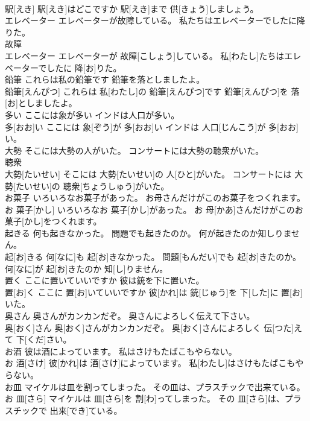 \documentclass[8pt]{extreport}
\begin{document}
\begin{CJK}{UTF8}{min}
\\	駅[えき] 駅[えき]はどこですか 駅[えき]まで 供[きょう]しましょう。
\\	エレベーター エレベーターが故障している。 私たちはエレベーターでしたに降りた。	
\\	故障 
\\	エレベーター エレベーターが 故障[こしょう]している。 私[わたし]たちはエレベーターでしたに 降[お]りた。
\\	鉛筆 これらは私の鉛筆です 鉛筆を落としましたよ。	
\\	鉛筆[えんぴつ] これらは 私[わたし]の 鉛筆[えんぴつ]です 鉛筆[えんぴつ]を 落[お]としましたよ。
\\	多い ここには象が多い インドは人口が多い。	
\\	多[おお]い ここには 象[ぞう]が 多[おお]い インドは 人口[じんこう]が 多[おお]い。
\\	大勢 そこには大勢の人がいた。 コンサートには大勢の聴衆がいた。	
\\	聴衆 
\\	大勢[たいせい] そこには 大勢[たいせい]の 人[ひと]がいた。 コンサートには 大勢[たいせい]の 聴衆[ちょうしゅう]がいた。
\\	お菓子 いろいろなお菓子があった。 お母さんだけがこのお菓子をつくれます。	
\\	お 菓子[かし] いろいろなお 菓子[かし]があった。 お 母[かあ]さんだけがこのお 菓子[かし]をつくれます。
\\	起きる 何も起きなかった。 問題でも起きたのか。 何が起きたのか知しりません。	
\\	起[お]きる 何[なに]も 起[お]きなかった。 問題[もんだい]でも 起[お]きたのか。 何[なに]が 起[お]きたのか 知[し]りません。
\\	置く ここに置いていいですか 彼は銃を下に置いた。	
\\	置[お]く ここに 置[お]いていいですか 彼[かれ]は 銃[じゅう]を 下[した]に 置[お]いた。
\\	奥さん 奥さんがカンカンだぞ。 奥さんによろしく伝えて下さい。	
\\	奥[おく]さん 奥[おく]さんがカンカンだぞ。 奥[おく]さんによろしく 伝[つた]えて 下[くだ]さい。
\\	お酒 彼は酒によっています。 私はさけもたばこもやらない。	
\\	お 酒[さけ] 彼[かれ]は 酒[さけ]によっています。 私[わたし]はさけもたばこもやらない。
\\	お皿 マイケルは皿を割ってしまった。 その皿は、プラスチックで出来ている。	
\\	お 皿[さら] マイケルは 皿[さら]を 割[わ]ってしまった。 その 皿[さら]は、プラスチックで 出来[でき]ている。

\end{CJK}
\end{document}
